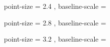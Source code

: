   {
    point-size     = \ScaleToNearestTenthPoint { \NormalPointSize } { 2.4 },
    baseline-scale = \NormalBaselineScale
  }

  {
    point-size     = \ScaleToNearestTenthPoint { \NormalPointSize } { 2.8 },
    baseline-scale = \NormalBaselineScale
  }

  {
    point-size     = \ScaleToNearestTenthPoint { \NormalPointSize } { 3.2 },
    baseline-scale = \NormalBaselineScale
  }




%

\NewDocumentCommand \miniscule { }
  {  }

\NewDocumentCommand \tiny { }
  {  }

\NewDocumentCommand \scriptsize { }
  {  }

\NewDocumentCommand \footnotesize { }
  {  }

\NewDocumentCommand \small { }
  {  }

\RenewDocumentCommand \normalsize { }
  {  }

\NewDocumentCommand \large { }
  {  }

\NewDocumentCommand \Large { }
  {  }

\NewDocumentCommand \LARGE { }
  {  }

\NewDocumentCommand \huge { }
  {  }

\NewDocumentCommand \Huge { }
  {  }

\NewDocumentCommand \HUGE { }
  {  }
